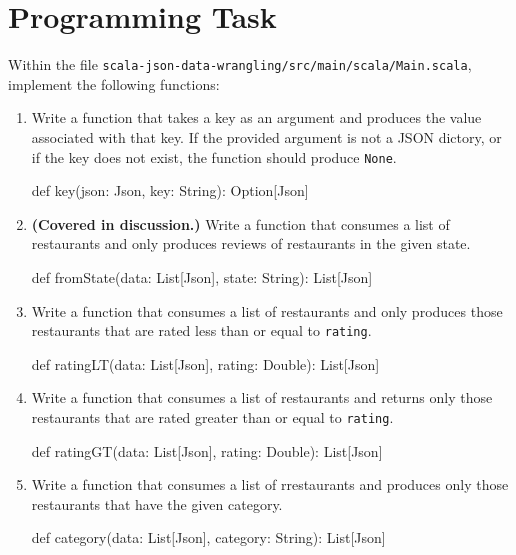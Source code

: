 \documentclass[9pt]{extbook}
\begin{document}
\section{Programming Task}


Within the file \verb|scala-json-data-wrangling/src/main/scala/Main.scala|,
implement the following functions:

\begin{enumerate}

    \item Write a function that takes a key as an argument and produces the
    value associated with that key. If the provided argument is not a JSON
    dictory, or if the key does not exist, the function should produce
    \lstinline|None|.
    \begin{scalacode}
    def key(json: Json, key: String): Option[Json]
    \end{scalacode}

    \item \textbf{(Covered in discussion.)} Write a function that consumes a
    list of restaurants and only produces reviews of restaurants in the given
    state.
    \begin{scalacode}
    def fromState(data: List[Json], state: String): List[Json]
    \end{scalacode}

    \item Write a function that consumes a list of restaurants and only
    produces those restaurants that are rated less than
    or equal to \lstinline|rating|.
    \begin{scalacode}
    def ratingLT(data: List[Json], rating: Double): List[Json]
    \end{scalacode}

    \item Write a function that consumes a list of restaurants
    and returns only those restaurants that are rated greater than
    or equal to \lstinline|rating|.
    \begin{scalacode}
    def ratingGT(data: List[Json], rating: Double): List[Json]
    \end{scalacode}

    \item Write a function that consumes a list of rrestaurants
     and produces only those restaurants
    that have the given category.
    \begin{scalacode}
    def category(data: List[Json], category: String): List[Json]
    \end{scalacode}


\end{enumerate}
\end{document}
